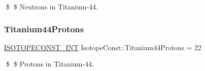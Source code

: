 \$ \$ Neutrons in Titanium-\/44. \mbox{\label{group___isotope_const-_titanium-_ti44_ga22cc0e336c5107ffd986453a066f4a66}} 
\subsubsection{\texorpdfstring{Titanium44\+Protons}{Titanium44Protons}}
{\footnotesize\ttfamily \mbox{\hyperlink{group___isotope_const-_macros_ga5f18360b3e99483a35c32d789e62621c}{I\+S\+O\+T\+O\+P\+E\+C\+O\+N\+S\+T\+\_\+\+I\+NT}} Isotope\+Const\+::\+Titanium44\+Protons = 22}

\$ \$ Protons in Titanium-\/44. 